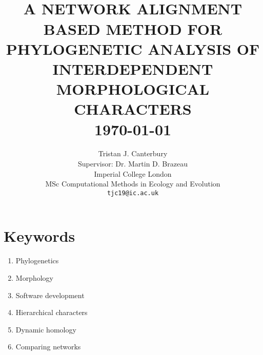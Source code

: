 \documentclass[fontsize=11pt]{scrartcl}\usepackage[]{graphicx}\usepackage[]{color}
\title{	
			\HRule{0.5pt} \\						%
			\LARGE \textbf{\uppercase{A Network Alignment Based Method for Phylogenetic Analysis of Interdependent Morphological Characters}}	%
			\HRule{2pt} \\ [0.5cm]		%
			\normalsize \today			%
		}
\author{
		Tristan J. Canterbury\\	
    Supervisor: Dr. Martin D. Brazeau\\
		Imperial College London\\	
		MSc Computational Methods in Ecology and Evolution\\
        \texttt{tjc19@ic.ac.uk} \\
}
\makeatletter
\def\printtitle{%
    {\centering \@title\par}}
\def\printauthor{%
    {\centering \large \@author}}
\makeatother
\begin{document}
    \thispagestyle{empty}		%

  \printtitle					%
      \vfill
  \printauthor				%
  \newpage
  \setcounter{page}{1}

  \section{Keywords}
  \begin{enumerate}
    \item Phylogenetics
    \item Morphology
    \item Software development
    \item Hierarchical characters
    \item Dynamic homology
    \item Comparing networks
  \end{enumerate}
\end{document}
